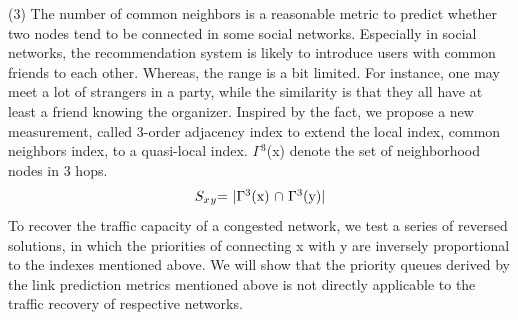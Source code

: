 \documentclass[onecolumn,preprintnumbers,amsmath,amssymb]{revtex4}
\begin{document}
(3) The number of common neighbors is a reasonable metric to predict whether two nodes tend to be connected in some social networks. 
Especially in social networks, the recommendation system is likely to introduce users with common friends to each other.  
Whereas, the range is a bit limited. 
For instance, one may meet a lot of strangers in a party, while the similarity is that they all have at least a friend knowing the organizer. 
Inspired by the fact, we propose a new measurement, called 3-order adjacency index to extend the local index, common neighbors index, to a quasi-local index. $\Gamma$$^3$(x) denote the set of neighborhood nodes in 3 hops.
\begin{equation}
\centerline{
$S_x$$_y$=
$|$$\Gamma$$^3$(x) $\cap$ $\Gamma$$^3$(y)$|$
}
\end{equation}
To recover the traffic capacity of a congested network, we test a series of reversed solutions, in which the priorities of connecting x with y are inversely proportional to the indexes mentioned above. 
We will show that the priority queues derived by the link prediction metrics mentioned above is not directly applicable to the traffic recovery of respective networks.









\end{document}

